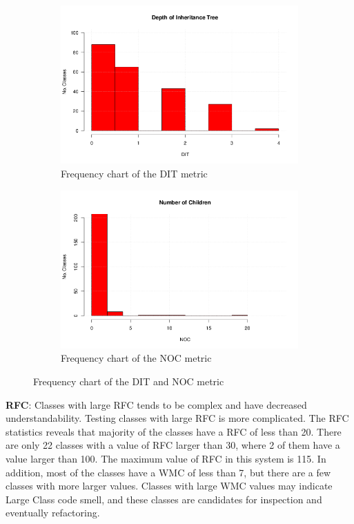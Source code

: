 \begin{figure}[!tbp]
\centering
\begin{subfigure}{\textwidth}
	\centering
	\includegraphics[width=.5\textwidth]{images/DIT.png}
	\caption{Frequency chart of the DIT metric}
	\label{fig:ditdistribution}
\end{subfigure}
\begin{subfigure}{\textwidth}
	\centering
	\includegraphics[width=.5\textwidth]{images/NOC.png}
	\caption{Frequency chart of the NOC metric}
	\label{fig:nocdistribution}
\end{subfigure}
\caption{Frequency chart of the DIT and NOC metric}
\end{figure}


\textbf{RFC}: Classes with large RFC tends to be complex and have decreased understandability. Testing classes with large RFC is more complicated. The RFC statistics reveals that majority of the classes have a RFC of less than 20. There are only 22 classes with a value of RFC larger than 30, where 2 of them have a value larger than 100. The maximum value of RFC in this system is 115. In addition, most of the classes have a WMC of less than 7, but there are a few classes with more larger values. Classes with large WMC values may indicate Large Class code smell, and these classes are candidates for inspection and eventually refactoring. 

